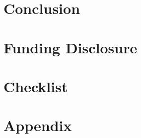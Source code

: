 \documentclass{article}
\begin{document}
\section{Conclusion}
\label{sec:conclusion}


\section{Funding Disclosure}
\label{sec:funding}





\newpage
\section*{Checklist}


\newpage
\appendix
\section{Appendix}

\end{document}

